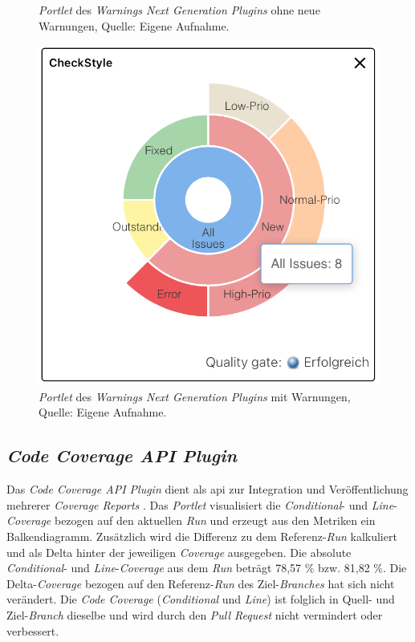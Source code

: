 {\begin{figure}[H]
\begin{minipage}[t]{0.45\textwidth}
\caption[\textit{Portlet} des \textit{Warnings Next Generation Plugins} ohne neue Warnungen .]{\textit{Portlet} des \textit{Warnings Next Generation Plugins} ohne neue Warnungen, Quelle: Eigene Aufnahme.}
\label{fig:warning2}
\end{minipage}

\begin{minipage}[t]{0.45\textwidth}
\centering
\includegraphics[width=\textwidth]{source/images/warning3}
\caption[\textit{Portlet} des \textit{Warnings Next Generation Plugins} mit Warnungen.]{\textit{Portlet} des \textit{Warnings Next Generation Plugins} mit Warnungen, Quelle: Eigene Aufnahme.}
\label{fig:warning3}
\end{minipage}
\end{figure}

\subsection{\textit{Code Coverage API Plugin}}
\label{chap:code-coverage-api}

Das \textit{Code Coverage API Plugin} dient als \ac{api} zur Integration und Veröffentlichung mehrerer \textit{Coverage Reports} \citep{code-coverage-api-plugin}. Das \textit{Portlet} visualisiert die \textit{Conditional}- und \textit{Line}-\textit{Coverage} bezogen auf den aktuellen \textit{Run} und erzeugt aus den Metriken ein Balkendiagramm. Zusätzlich wird die Differenz zu dem Referenz-\textit{Run} kalkuliert und als Delta hinter der jeweiligen \textit{Coverage} ausgegeben. Die absolute \textit{Conditional}- und \textit{Line}-\textit{Coverage} aus dem \textit{Run} beträgt 78,57 \% bzw. 81,82 \%. Die Delta-\textit{Coverage} bezogen auf den Referenz-\textit{Run} des Ziel-\textit{Branches} hat sich nicht verändert. Die \textit{Code Coverage} (\textit{Conditional} und \textit{Line}) ist folglich in Quell- und Ziel-\textit{Branch} dieselbe und wird durch den \textit{Pull Request} nicht vermindert oder verbessert.

}
